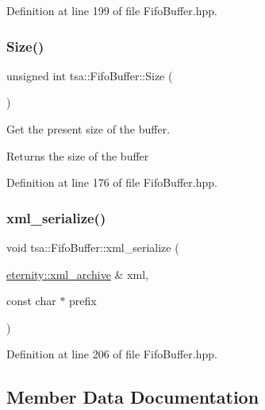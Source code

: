 Definition at line 199 of file Fifo\+Buffer.\+hpp.

\mbox{\label{classtsa_1_1_fifo_buffer_a7c14d2ae86c581d1ccc427dccb3f1213}} 
\subsubsection{\texorpdfstring{Size()}{Size()}}
{\footnotesize\ttfamily unsigned int tsa\+::\+Fifo\+Buffer\+::\+Size (\begin{DoxyParamCaption}{ }\end{DoxyParamCaption})\hspace{0.3cm}{\ttfamily [inline]}}

Get the present size of the buffer.

\begin{DoxyReturn}{Returns}
the size of the buffer 
\end{DoxyReturn}


Definition at line 176 of file Fifo\+Buffer.\+hpp.

\mbox{\label{classtsa_1_1_fifo_buffer_a8ad8bf7c3935bf645b6cda8be7de441a}} 
\subsubsection{\texorpdfstring{xml\+\_\+serialize()}{xml\_serialize()}}
{\footnotesize\ttfamily void tsa\+::\+Fifo\+Buffer\+::xml\+\_\+serialize (\begin{DoxyParamCaption}\item[{\hyperlink{classeternity_1_1xml__archive}{eternity\+::xml\+\_\+archive} \&}]{xml,  }\item[{const char $\ast$}]{prefix }\end{DoxyParamCaption})\hspace{0.3cm}{\ttfamily [inline]}}



Definition at line 206 of file Fifo\+Buffer.\+hpp.



\subsection{Member Data Documentation}
\mbox{\label{classtsa_1_1_fifo_buffer_aa8039b60b66e4e6bedd661352fff095f}} 
